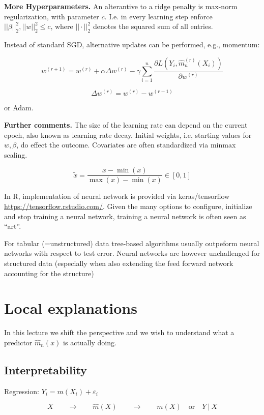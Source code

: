 \documentclass[
]{book}
\begin{document}
\textbf{More Hyperparameters.} An alterantive to a ridge penalty is max-norm regularization, with parameter \(c\). I.e. in every learning step enforce \(||\beta||^2_2, ||w||^2_2\leq c\), where \(||\cdot||^2_2\) denotes the squared sum of all entries.

Instead of standard SGD, alternative updates can be performed, e.g., momentum:

\[
w^{(r+1)}=w^{(r)} +\alpha \Delta w^{(r)}  - \gamma  \sum_{i=1}^n \frac{\partial L(Y_i,\hat m_n^{(r)}(X_i))}{\partial w^{(r)}}
\]

\[
\Delta w^{(r)}= w^{(r)}-w^{(r-1)}
\]

or Adam.

\textbf{Further comments.} The size of the learning rate can depend on the current epoch, also known as learning rate decay. Initial weights, i.e, starting values for \(w, \beta\), do effect the outcome. Covariates are often standardized via minmax scaling.

\[
\tilde x = \frac{x- \min(x)}{\max(x)-\min(x)} \in [0,1]
\]

In R, implementation of neural network is provided via keras/tensorflow \url{https://tensorflow.rstudio.com/}. Given the many options to configure, initialize and stop training a neural network, training a neural network is often seen as ``art''.

For tabular (=unstructured) data tree-based algorithms usually outpeform neural networks with respect to test error. Neural networks are however unchallenged for structured data (especially when also extending the feed forward network accounting for the structure)

\hypertarget{local-explanations}{%
\section{Local explanations}\label{local-explanations}}

In this lecture we shift the perspective and we wish to understand what a predictor \(\hat m_n(x)\) is actually doing.

\hypertarget{interpretability}{%
\subsection{Interpretability}\label{interpretability}}

Regression: \(Y_i=m(X_i)+\varepsilon_i\)

\[
X\qquad \rightarrow \qquad  \widehat m (X)  \qquad \rightarrow  \qquad   m (X)\quad \text{or}\quad Y\ \vert\ X
\]
\end{document}
